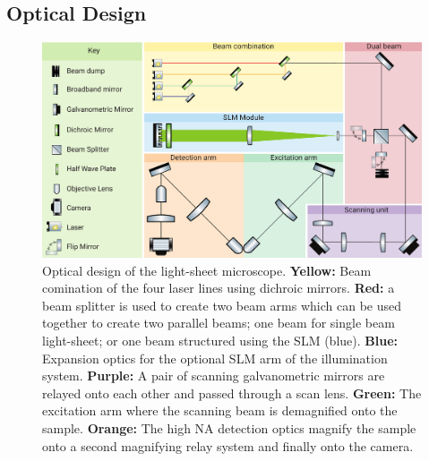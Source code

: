 \subsection{Optical Design}

\begin{landscape}
  \begin{figure}
  \centering
  \includegraphics[width=\linewidth]{./optical_design_colour}
  \caption[Full optical design of new SPIM]{
  Optical design of the light-sheet microscope. \textbf{Yellow:} Beam comination of the four laser lines using dichroic mirrors.
  \textbf{Red:} a beam splitter is used to create two beam arms which can be used together to create two parallel beams; one beam for single beam light-sheet; or one beam structured using the SLM (blue).
  \textbf{Blue:} Expansion optics for the optional SLM arm of the illumination system.
  \textbf{Purple:} A pair of scanning galvanometric mirrors are relayed onto each other and passed through a scan lens.
  \textbf{Green:} The excitation arm where the scanning beam is demagnified onto the sample.
  \textbf{Orange:} The high NA detection optics magnify the sample onto a second magnifying relay system and finally onto the camera.
  }
  \label{fig:opticaldesign}
  \end{figure}
\end{landscape}

